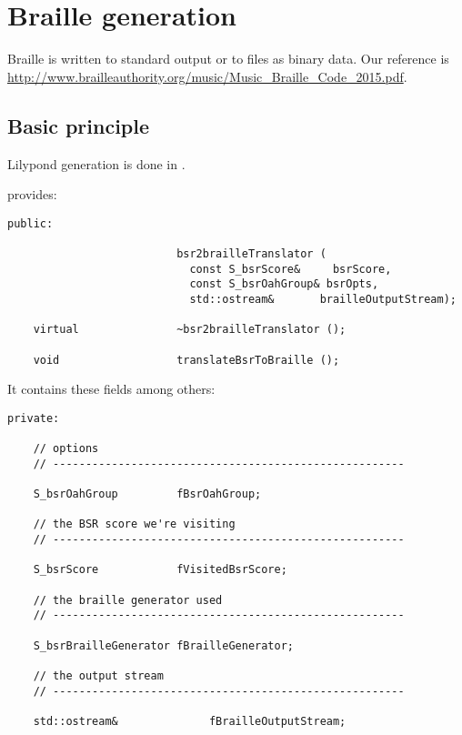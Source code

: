 
\chapter{Braille generation}


Braille is written to standard output or to files as binary data. Our reference is \url{http://www.brailleauthority.org/music/Music_Braille_Code_2015.pdf}.


\section{Basic principle}

Lilypond generation is done in .

 provides:
\begin{lstlisting}[language=CPlusPlus]
  public:

                          bsr2brailleTranslator (
                            const S_bsrScore&     bsrScore,
                            const S_bsrOahGroup& bsrOpts,
                            std::ostream&       brailleOutputStream);

    virtual               ~bsr2brailleTranslator ();

    void                  translateBsrToBraille ();
\end{lstlisting}

It contains these fields among others:
\begin{lstlisting}[language=CPlusPlus]
  private:

    // options
    // ------------------------------------------------------

    S_bsrOahGroup         fBsrOahGroup;

    // the BSR score we're visiting
    // ------------------------------------------------------

    S_bsrScore            fVisitedBsrScore;

    // the braille generator used
    // ------------------------------------------------------

    S_bsrBrailleGenerator fBrailleGenerator;

    // the output stream
    // ------------------------------------------------------

    std::ostream&              fBrailleOutputStream;
\end{lstlisting}


